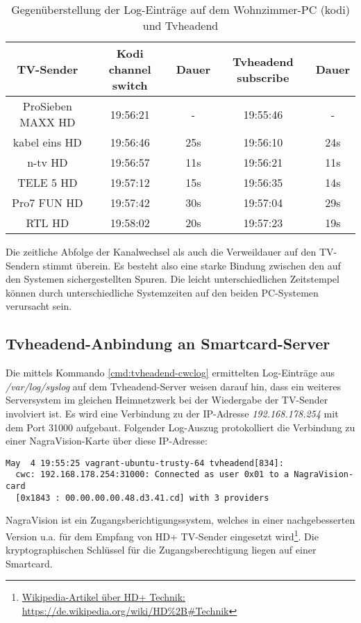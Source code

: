 \begin{table}[H]
\begin{tabular}{ccccc}
\hline 
TV-Sender & Kodi channel switch & Dauer & Tvheadend subscribe & Dauer \\ 
\hline 
ProSieben MAXX HD & 19:56:21 & - & 19:55:46 & - \\ 
\hline 
kabel eins HD & 19:56:46 & 25s & 19:56:10 & 24s \\ 
\hline 
n-tv HD & 19:56:57 & 11s & 19:56:21 & 11s \\ 
\hline 
TELE 5 HD & 19:57:12 & 15s & 19:56:35 & 14s \\ 
\hline 
Pro7 FUN HD & 19:57:42 & 30s & 19:57:04 & 29s \\ 
\hline 
RTL HD & 19:58:02 & 20s & 19:57:23 & 19s \\ 
\hline 
\end{tabular}
\caption{Gegenüberstellung der Log-Einträge auf dem Wohnzimmer-PC (kodi) und Tvheadend}
\label{table:tvheadend-logcompare}
\end{table}

Die zeitliche Abfolge der Kanalwechsel als auch die Verweildauer auf den TV-Sendern stimmt überein. Es besteht also eine starke Bindung zwischen den auf den Systemen sichergestellten Spuren. Die leicht unterschiedlichen Zeitstempel können durch unterschiedliche Systemzeiten auf den beiden PC-Systemen verursacht sein.

\subsection{Tvheadend-Anbindung an Smartcard-Server}

Die mittels Kommando \autoref{cmd:tvheadend-cwclog} ermittelten Log-Einträge aus \textit{/var/log/syslog} auf dem Tvheadend-Server weisen darauf hin, dass ein weiteres Serversystem im gleichen Heimnetzwerk bei der Wiedergabe der TV-Sender involviert ist. Es wird eine Verbindung zu der IP-Adresse \textit{192.168.178.254} mit dem Port 31000 aufgebaut. Folgender Log-Auszug protokolliert die Verbindung zu einer NagraVision-Karte über diese IP-Adresse:

\begin{Verbatim}
May  4 19:55:25 vagrant-ubuntu-trusty-64 tvheadend[834]: 
  cwc: 192.168.178.254:31000: Connected as user 0x01 to a NagraVision-card
  [0x1843 : 00.00.00.00.48.d3.41.cd] with 3 providers
\end{Verbatim}

NagraVision ist ein Zugangsberichtigungssystem, welches in einer nachgebesserten Version u.a. für dem Empfang von HD+ TV-Sender eingesetzt wird\footnote{\href{https://de.wikipedia.org/wiki/HD\%2B\#Technik}{Wikipedia-Artikel über HD+ Technik: https://de.wikipedia.org/wiki/HD\%2B\#Technik}}. Die kryptographischen Schlüssel für die Zugangsberechtigung liegen auf einer Smartcard.

